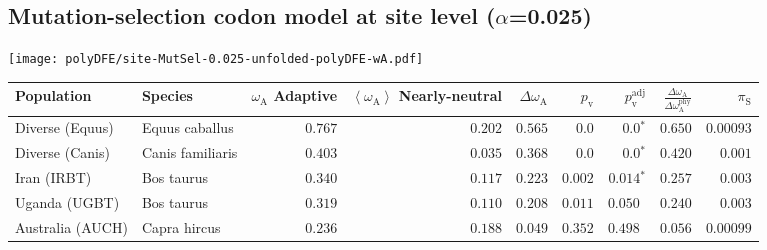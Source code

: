 \subsection{Mutation-selection codon model at site level ($\alpha$=0.025)}
\begin{center}
\texttt{[image: polyDFE/site-MutSel-0.025-unfolded-polyDFE-wA.pdf]}
\begin{adjustbox}{width = 1\textwidth}
\begin{tabular}{|l|l|r|r|r|r|r|r|r|}
\toprule
                     Population &              Species & \specialcell{$\omega_{\mathrm{A}}$ \\ Adaptive} & \specialcell{$\left< \omega_{\mathrm{A}} \right>$ \\ Nearly-neutral} & $\Delta \omega_{\mathrm{A}} $ & $p_{\mathrm{v}}$ & $p_{\mathrm{v}}^{\mathrm{adj}}$ & $\frac{\Delta\omega_{\mathrm{A}}}{\Delta\omega_{\mathrm{A}}^{\mathrm{phy}}}$ & $\pi_{\textrm{S}}$ \\
\midrule
                Diverse (Equus) &       Equus caballus &                                        $ 0.767$ &                                           $ 0.202$ &                      $ 0.565$ &            $0.0$ &                  $\bm{0.0{^*}}$ &                                           $ 0.650$ &          $0.00093$ \\
                Diverse (Canis) &     Canis familiaris &                                        $ 0.403$ &                                           $ 0.035$ &                      $ 0.368$ &            $0.0$ &                  $\bm{0.0{^*}}$ &                                           $ 0.420$ &           $ 0.001$ \\
                    Iran (IRBT) &           Bos taurus &                                        $ 0.340$ &                                           $ 0.117$ &                      $ 0.223$ &         $ 0.002$ &               $\bm{ 0.014{^*}}$ &                                           $ 0.257$ &           $ 0.003$ \\
                  Uganda (UGBT) &           Bos taurus &                                        $ 0.319$ &                                           $ 0.110$ &                      $ 0.208$ &         $ 0.011$ &                      $ 0.050~~$ &                                           $ 0.240$ &           $ 0.003$ \\
               Australia (AUCH) &         Capra hircus &                                        $ 0.236$ &                                           $ 0.188$ &                      $ 0.049$ &         $ 0.352$ &                      $ 0.498~~$ &                                           $ 0.056$ &          $0.00099$ \\

\end{tabular}
\end{adjustbox}
\end{center}
